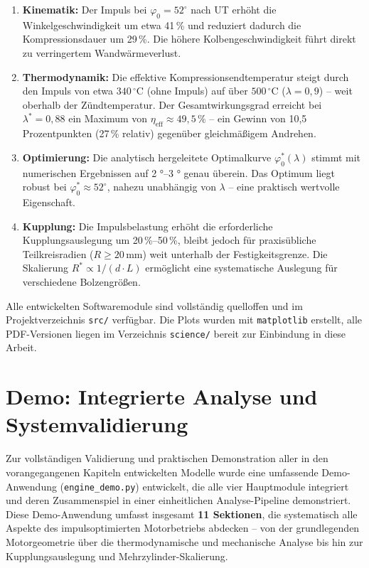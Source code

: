 ﻿\documentclass[a4paper,12pt]{article}
\begin{document}
\begin{enumerate}
  \item \textbf{Kinematik:} Der Impuls bei $\varphi_0 = 52^\circ$ nach UT
    erhöht die Winkelgeschwindigkeit um etwa 41\,\% und reduziert dadurch
    die Kompressionsdauer um 29\,\%. Die höhere Kolbengeschwindigkeit führt
    direkt zu verringertem Wandwärmeverlust.

  \item \textbf{Thermodynamik:} Die effektive Kompressionsendtemperatur
    steigt durch den Impuls von etwa $340\,^\circ\text{C}$ (ohne Impuls)
    auf über $500\,^\circ\text{C}$ ($\lambda = 0{,}9$) -- weit oberhalb der
    Zündtemperatur. Der Gesamtwirkungsgrad erreicht bei $\lambda^* = 0{,}88$
    ein Maximum von $\eta_\text{eff} \approx 49{,}5\,\%$ -- ein Gewinn von
    10{,}5 Prozentpunkten (27\,\% relativ) gegenüber gleichmäßigem Andrehen.

  \item \textbf{Optimierung:} Die analytisch hergeleitete Optimalkurve
    $\varphi_0^*(\lambda)$ stimmt mit numerischen Ergebnissen auf 2 °--3 ° genau
    überein. Das Optimum liegt robust bei $\varphi_0^* \approx 52^\circ$,
    nahezu unabhängig von $\lambda$ -- eine praktisch wertvolle Eigenschaft.

  \item \textbf{Kupplung:} Die Impulsbelastung erhöht die erforderliche
    Kupplungsauslegung um 20\,\%--50\,\%, bleibt jedoch für praxisübliche
    Teilkreisradien ($R \geq 20\,\text{mm}$) weit unterhalb der Festigkeitsgrenze.
    Die Skalierung $R^* \propto 1/(d \cdot L)$ ermöglicht eine systematische
    Auslegung für verschiedene Bolzengrößen.
\end{enumerate}

Alle entwickelten Softwaremodule sind vollständig quelloffen und im
Projektverzeichnis \texttt{src/} verfügbar. Die Plots wurden mit
\texttt{matplotlib} erstellt, alle PDF-Versionen liegen im Verzeichnis
\texttt{science/} bereit zur Einbindung in diese Arbeit.

\section{Demo: Integrierte Analyse und Systemvalidierung}
\label{sec:demo}

Zur vollständigen Validierung und praktischen Demonstration aller in den
vorangegangenen Kapiteln entwickelten Modelle wurde eine umfassende
Demo-Anwendung (\texttt{engine\_demo.py}) entwickelt, die alle vier
Hauptmodule integriert und deren Zusammenspiel in einer einheitlichen
Analyse-Pipeline demonstriert. Diese Demo-Anwendung umfasst insgesamt
\textbf{11 Sektionen}, die systematisch alle Aspekte des impulsoptimierten
Motorbetriebs abdecken -- von der grundlegenden Motorgeometrie über die
thermodynamische und mechanische Analyse bis hin zur Kupplungsauslegung
und Mehrzylinder-Skalierung.
\end{document}
